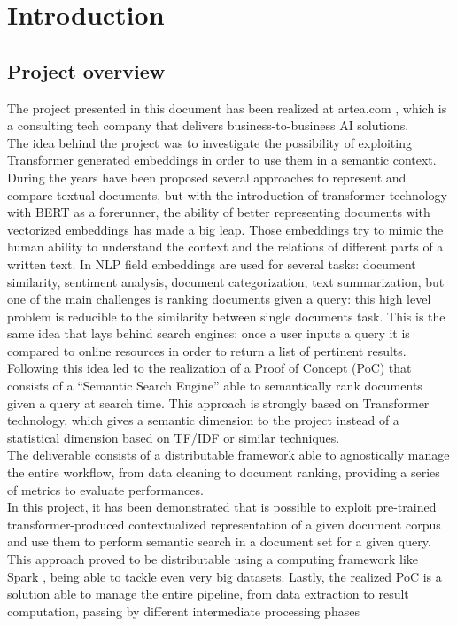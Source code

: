 \documentclass[\main/main.tex]{subfiles}
\begin{document}
\chapter*{Introduction}
\section*{Project overview}
The project presented in this document has been realized at artea.com \cite{artea}, which is a consulting tech company that delivers business-to-business AI solutions. \\
The idea behind the project was to investigate the possibility of exploiting Transformer generated embeddings in order to use them in a semantic context. During the years have been proposed several approaches to represent and compare textual documents, but with the introduction of transformer technology with BERT as a forerunner, the ability of better representing documents with vectorized embeddings has made a big leap. Those embeddings try to mimic the human ability to understand the context and the relations of different parts of a written text. In NLP field embeddings are used for several tasks: document similarity, sentiment analysis, document categorization, text summarization, but one of the main challenges is ranking documents given a query: this high level problem is reducible to the similarity between single documents task. This is the same idea that lays behind search engines: once a user inputs a query it is compared to online resources in order to return a list of pertinent results. \\
Following this idea led to the realization of a Proof of Concept (PoC) that consists of a ``Semantic Search Engine'' able to semantically rank documents given a query at search time. This approach is strongly based on Transformer technology, which gives a semantic dimension to the project instead of a statistical dimension based on TF/IDF or similar techniques. \\
The deliverable consists of a distributable framework able to agnostically manage the entire workflow, from data cleaning to document ranking, providing a series of metrics to evaluate performances. \\
In this project, it has been demonstrated that is possible to exploit pre-trained transformer-produced contextualized representation of a given document corpus and use them to perform semantic search in a document set for a given query. This approach proved to be distributable using a computing framework like Spark \cite{zaharia2010spark}, being able to tackle even very big datasets. Lastly, the realized PoC is a solution able to manage the entire pipeline, from data extraction to result computation, passing by different intermediate processing phases
\end{document}
